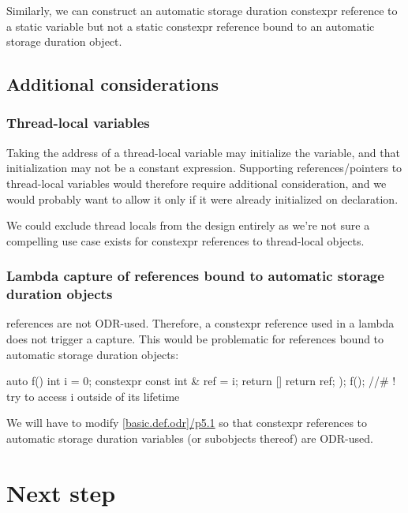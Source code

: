 \documentclass{wg21}
\begin{document}
Similarly, we can construct an automatic storage duration constexpr reference to a static variable but not a static constexpr reference bound to an automatic storage duration object.

\subsection{Additional considerations}

\subsubsection{Thread-local variables}

Taking the address of a thread-local variable may initialize the variable, and that initialization may not be a constant expression.
Supporting references/pointers to thread-local variables would therefore require additional consideration, and we would probably want to allow it only if it were  already initialized
on declaration.

We could exclude thread locals from the design entirely as we're not sure a compelling use case exists for constexpr references to thread-local objects.

\subsubsection{Lambda capture of  references bound to automatic storage duration objects}

 references are not ODR-used.  Therefore, a constexpr reference used in a lambda does not trigger a capture.
This would be problematic for references bound to automatic storage duration objects:

\begin{colorblock}
auto f() {
    int i = 0;
    constexpr const int & ref = i;
    return [] {
        return ref;
    });
}
f(); //# ! try to access i outside of its lifetime
\end{colorblock}

We will have to modify \href{http://eel.is/c++draft/basic.def.odr#5.1}{[basic.def.odr]/p5.1} so that constexpr references to automatic storage duration variables (or subobjects thereof) are ODR-used.

\section{Next step}
\end{document}
